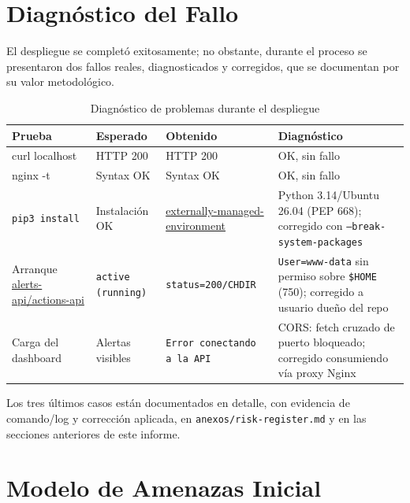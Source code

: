 \documentclass[journal]{IEEEtran}
\begin{document}
\section{Diagnóstico del Fallo}

El despliegue se completó exitosamente; no obstante, durante el proceso se
presentaron dos fallos reales, diagnosticados y corregidos, que se documentan
por su valor metodológico.

\begin{table}[t]
\centering
\caption{Diagnóstico de problemas durante el despliegue}
\label{tab:diagnostico}
\small
\renewcommand{\arraystretch}{1.3}
\begin{tabular}{|>{\raggedright\arraybackslash}p{3.2cm}|>{\raggedright\arraybackslash}p{2.6cm}|>{\raggedright\arraybackslash}p{4.5cm}|>{\raggedright\arraybackslash}p{6.5cm}|}
\hline
\textbf{Prueba} &
\textbf{Esperado} &
\textbf{Obtenido} &
\textbf{Diagnóstico} \\
\hline
curl localhost & HTTP 200 & HTTP 200 & OK, sin fallo \\
\hline
nginx -t & Syntax OK & Syntax OK & OK, sin fallo \\
\hline
\texttt{pip3 install} & Instalación OK & \url{externally-managed-environment} & Python 3.14/Ubuntu 26.04 (PEP 668); corregido con \texttt{--break-system-packages} \\
\hline
Arranque \url{alerts-api/actions-api} & \texttt{active (running)} & \texttt{status=200/CHDIR} & \texttt{User=www-data} sin permiso sobre \texttt{\$HOME} (750); corregido a usuario dueño del repo \\
\hline
Carga del dashboard & Alertas visibles & \texttt{Error conectando a la API} & CORS: fetch cruzado de puerto bloqueado; corregido consumiendo vía proxy Nginx \\
\hline
\end{tabular}
\end{table}

Los tres últimos casos están documentados en detalle, con evidencia de
comando/log y corrección aplicada, en \texttt{anexos/risk-register.md} y en las
secciones anteriores de este informe.

\section{Modelo de Amenazas Inicial}
\label{sec:amenazas}
\end{document}

